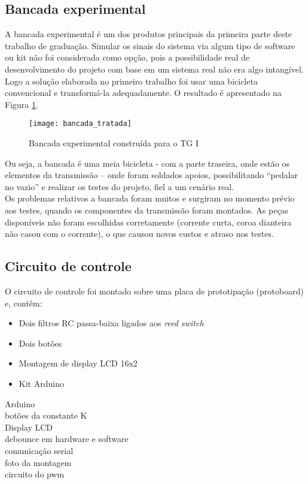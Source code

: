 \documentclass[a4paper,11pt]{article}
\begin{document}
\subsection{Bancada experimental}
\label{sec:bancada}
A bancada experimental é um dos produtos principais da primeira parte deste
trabalho de graduação. Simular os sinais do sistema via algum tipo de software
ou kit não foi considerada como opção, pois a possibilidade real de
desenvolvimento do projeto com base em um sistema real não era algo intangível.
Logo a solução elaborada no primeiro trabalho foi usar uma bicicleta
convencional e transformá-la adequadamente. O resultado é apresentado na Figura
\ref{fig:bancada}.
\begin{figure}[ht]
 \begin{center}
  \texttt{[image: bancada\_tratada]}
 \end{center}
 \caption{Bancada experimental construída para o TG I}
 \label{fig:bancada}
\end{figure}
Ou seja, a bancada é uma meia bicicleta - com a parte traseira, onde estão os
elementos da transmissão  -- onde foram soldados apoios, possibilitando
``pedalar no vazio'' e realizar os testes do projeto, fiel a um cenário real. \\
Os problemas relativos a bancada foram muitos e surgiram no momento prévio aos
testes, quando os componentes da transmissão foram montados. As peças
disponíveis não foram escolhidas corretamente (corrente curta, coroa dianteira
não casou com o corrente), o que causou novos custos e atraso nos testes.

%
\subsection{Circuito de controle}
\label{sec:arduino}
O circuito de controle foi montado sobre uma placa de prototipação (protoboard)
e, contêm:
\begin{itemize}
  \item Dois filtros RC passa-baixa ligados aos \textit{reed switch}
  \item Dois botões
  \item Montagem de display LCD 16x2
  \item Kit Arduino
\end{itemize}


Arduino\\
botões da constante K \\
Display LCD \\
debounce em hardware e software \\
comunicação serial \\
foto da montagem \\
circuito do pwm \\
\end{document}
